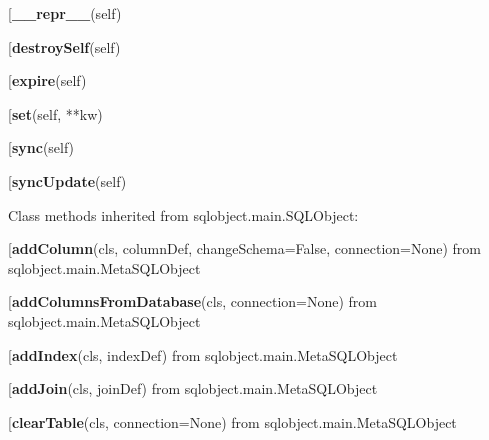 \begin{description}\item[{\bf \_\_repr\_\_}(self)\end{description}

\begin{description}\item[{\bf destroySelf}(self)\end{description}

\begin{description}\item[{\bf expire}(self)\end{description}

\begin{description}\item[{\bf set}(self, **kw)\end{description}

\begin{description}\item[{\bf sync}(self)\end{description}

\begin{description}\item[{\bf syncUpdate}(self)\end{description}


Class methods inherited from sqlobject.main.SQLObject:\\
\begin{description}\item[{\bf addColumn}(cls, columnDef, changeSchema=False, connection=None) from sqlobject.main.MetaSQLObject\end{description}

\begin{description}\item[{\bf addColumnsFromDatabase}(cls, connection=None) from sqlobject.main.MetaSQLObject\end{description}

\begin{description}\item[{\bf addIndex}(cls, indexDef) from sqlobject.main.MetaSQLObject\end{description}

\begin{description}\item[{\bf addJoin}(cls, joinDef) from sqlobject.main.MetaSQLObject\end{description}

\begin{description}\item[{\bf clearTable}(cls, connection=None) from sqlobject.main.MetaSQLObject\end{description}

